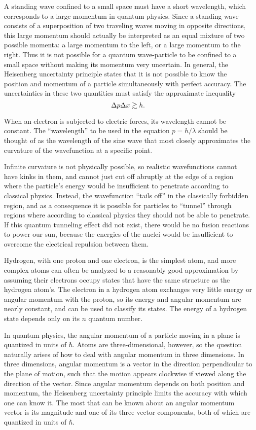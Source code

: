 A standing wave confined to a small space must have a short
wavelength, which corresponds to a large momentum in quantum
physics. Since a standing wave consists of a superposition
of two traveling waves moving in opposite directions, this
large momentum should actually be interpreted as an equal
mixture of two possible momenta: a large momentum to the
left, or a large momentum to the right. Thus it is not
possible for a quantum wave-particle to be confined to a
small space without making its momentum very uncertain. In
general, the Heisenberg uncertainty principle states that it
is not possible to know the position and momentum of a
particle simultaneously with perfect accuracy. The
uncertainties in these two quantities must satisfy the
approximate inequality
\begin{equation*}
    \Delta p\Delta x \gtrsim h.
\end{equation*}

When an electron is subjected to electric forces, its
wavelength cannot be constant. The ``wavelength'' to be used
in the equation $p=h/\lambda$ should be thought of as the
wavelength of the sine wave that most closely approximates
the curvature of the wavefunction at a specific point.

Infinite curvature is not physically possible, so realistic
wavefunctions cannot have kinks in them, and cannot just cut
off abruptly at the edge of a region where the particle's
energy would be insufficient to penetrate according to
classical physics. Instead, the wavefunction ``tails off''
in the classically forbidden region, and as a consequence it
is possible for particles to ``tunnel'' through regions
where according to classical physics they should not be able
to penetrate. If this quantum tunneling effect did not
exist, there would be no fusion reactions to power our sun,
because the energies of the nuclei would be insufficient to
overcome the electrical repulsion between them.

Hydrogen, with one proton and one electron, is the simplest
atom, and more complex atoms can often be analyzed to a
reasonably good approximation by assuming their electrons
occupy states that have the same structure as the hydrogen
atom's. The electron in a hydrogen atom exchanges very
little energy or angular momentum with the proton, so its
energy and angular momentum are nearly constant, and can be
used to classify its states. The energy of a hydrogen state
depends only on its $n$ quantum number.

In quantum physics, the angular momentum of a particle
moving in a plane is quantized in units of $\hbar$. Atoms are
three-dimensional, however, so the question naturally arises
of how to deal with angular momentum in three dimensions. In
three dimensions, angular momentum is a vector in the
direction perpendicular to the plane of motion, such that
the motion appears clockwise if viewed along the direction
of the vector. Since angular momentum depends on both
position and momentum, the Heisenberg uncertainty principle
limits the accuracy with which one can know it. The most that
can be known about an angular momentum vector is its
magnitude and one of its three vector components, both of
which are quantized in units of $\hbar$.


